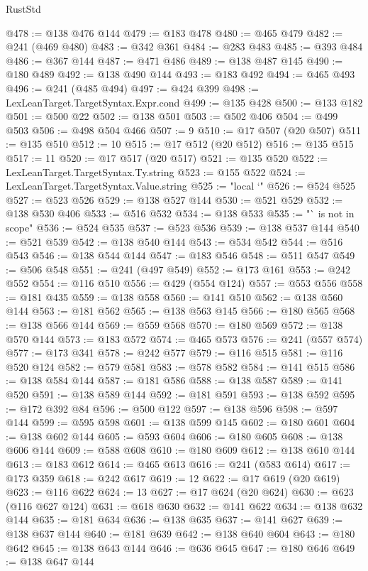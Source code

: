\begin{lexlean}{RustStd}
\begin{coremodule}
@478 := @138 @476 @144
@479 := @183 @478
@480 := @465 @479
@482 := @241 (@469 @480)
@483 := @342 @361
@484 := @283 @483
@485 := @393 @484
@486 := @367 @144
@487 := @471 @486
@489 := @138 @487 @145
@490 := @180 @489
@492 := @138 @490 @144
@493 := @183 @492
@494 := @465 @493
@496 := @241 (@485 @494)
@497 := @424 @399
@498 := LexLeanTarget.TargetSyntax.Expr.cond
@499 := @135 @428
@500 := @133 @182
@501 := @500 @22
@502 := @138 @501
@503 := @502 @406
@504 := @499 @503
@506 := @498 @504 @466
@507 := 9
@510 := @17 @507 (@20 @507)
@511 := @135 @510
@512 := 10
@515 := @17 @512 (@20 @512)
@516 := @135 @515
@517 := 11
@520 := @17 @517 (@20 @517)
@521 := @135 @520
@522 := LexLeanTarget.TargetSyntax.Ty.string
@523 := @155 @522
@524 := LexLeanTarget.TargetSyntax.Value.string
@525 := "local `"
@526 := @524 @525
@527 := @523 @526
@529 := @138 @527 @144
@530 := @521 @529
@532 := @138 @530 @406
@533 := @516 @532
@534 := @138 @533
@535 := "` is not in scope"
@536 := @524 @535
@537 := @523 @536
@539 := @138 @537 @144
@540 := @521 @539
@542 := @138 @540 @144
@543 := @534 @542
@544 := @516 @543
@546 := @138 @544 @144
@547 := @183 @546
@548 := @511 @547
@549 := @506 @548
@551 := @241 (@497 @549)
@552 := @173 @161
@553 := @242 @552
@554 := @116 @510
@556 := @429 (@554 @124)
@557 := @553 @556
@558 := @181 @435
@559 := @138 @558
@560 := @141 @510
@562 := @138 @560 @144
@563 := @181 @562
@565 := @138 @563 @145
@566 := @180 @565
@568 := @138 @566 @144
@569 := @559 @568
@570 := @180 @569
@572 := @138 @570 @144
@573 := @183 @572
@574 := @465 @573
@576 := @241 (@557 @574)
@577 := @173 @341
@578 := @242 @577
@579 := @116 @515
@581 := @116 @520 @124
@582 := @579 @581
@583 := @578 @582
@584 := @141 @515
@586 := @138 @584 @144
@587 := @181 @586
@588 := @138 @587
@589 := @141 @520
@591 := @138 @589 @144
@592 := @181 @591
@593 := @138 @592
@595 := @172 @392 @84
@596 := @500 @122
@597 := @138 @596
@598 := @597 @144
@599 := @595 @598
@601 := @138 @599 @145
@602 := @180 @601
@604 := @138 @602 @144
@605 := @593 @604
@606 := @180 @605
@608 := @138 @606 @144
@609 := @588 @608
@610 := @180 @609
@612 := @138 @610 @144
@613 := @183 @612
@614 := @465 @613
@616 := @241 (@583 @614)
@617 := @173 @359
@618 := @242 @617
@619 := 12
@622 := @17 @619 (@20 @619)
@623 := @116 @622
@624 := 13
@627 := @17 @624 (@20 @624)
@630 := @623 (@116 @627 @124)
@631 := @618 @630
@632 := @141 @622
@634 := @138 @632 @144
@635 := @181 @634
@636 := @138 @635
@637 := @141 @627
@639 := @138 @637 @144
@640 := @181 @639
@642 := @138 @640 @604
@643 := @180 @642
@645 := @138 @643 @144
@646 := @636 @645
@647 := @180 @646
@649 := @138 @647 @144

\end{coremodule}
\end{lexlean}
